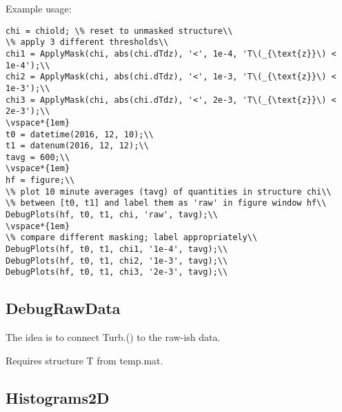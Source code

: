 Example usage:
\begin{lstlisting}
chi = chiold; \% reset to unmasked structure\\
\% apply 3 different thresholds\\
chi1 = ApplyMask(chi, abs(chi.dTdz), '<', 1e-4, 'T\(_{\text{z}}\) < 1e-4');\\
chi2 = ApplyMask(chi, abs(chi.dTdz), '<', 1e-3, 'T\(_{\text{z}}\) < 1e-3');\\
chi3 = ApplyMask(chi, abs(chi.dTdz), '<', 2e-3, 'T\(_{\text{z}}\) < 2e-3');\\
\vspace*{1em}
t0 = datetime(2016, 12, 10);\\
t1 = datenum(2016, 12, 12);\\
tavg = 600;\\
\vspace*{1em}
hf = figure;\\
\% plot 10 minute averages (tavg) of quantities in structure chi\\
\% between [t0, t1] and label them as 'raw' in figure window hf\\
DebugPlots(hf, t0, t1, chi, 'raw', tavg);\\
\vspace*{1em}
\% compare different masking; label appropriately\\
DebugPlots(hf, t0, t1, chi1, '1e-4', tavg);\\
DebugPlots(hf, t0, t1, chi2, '1e-3', tavg);\\
DebugPlots(hf, t0, t1, chi3, '2e-3', tavg);\\
\end{lstlisting}

\subsection{DebugRawData}
The idea is to connect Turb.() to the raw-ish data.

Requires structure T from temp.mat.

\subsection{Histograms2D}

